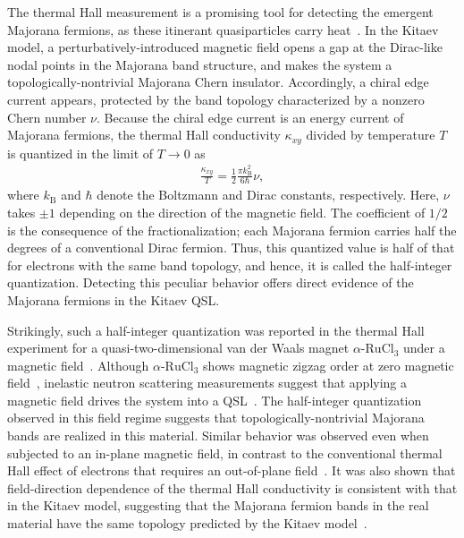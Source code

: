 \documentclass[twocolumn,superscriptaddress,showpacs, longbibliography, aps, prx]{revtex4-2}
\begin{document}
The thermal Hall measurement is a promising tool for detecting the emergent Majorana fermions, as these itinerant quasiparticles carry heat~\cite{Kitaev2006}. 
In the Kitaev model, a perturbatively-introduced magnetic field opens a gap at the Dirac-like nodal points in the Majorana band structure, and makes the system a topologically-nontrivial Majorana Chern insulator. 
Accordingly, a chiral edge current appears, protected by the band topology characterized by a nonzero Chern number $\nu$. 
Because the chiral edge current is an energy current of Majorana fermions, the thermal Hall conductivity $\kappa_{xy}$ divided by temperature $T$ is quantized in the limit of $T\to 0$ as
\begin{align}
{\frac{\kappa_{xy}}{T} = \frac{1}{2} \frac{\pi k_{\mathrm{B}}^2}{6\hbar}}\nu,
\label{eq:k_xy}
\end{align}
where $k_{\mathrm{B}}$ and $\hbar$ denote the Boltzmann and Dirac constants, respectively. 
Here, $\nu$ takes $\pm 1$ depending on the direction of the magnetic field. 
The coefficient of $1/2$ is the consequence of the fractionalization; each Majorana fermion carries half the degrees of a conventional Dirac fermion. 
Thus, this quantized value is half of that for electrons with the same band topology, and hence, it is called the half-integer quantization. 
Detecting this peculiar behavior offers direct evidence of the Majorana fermions in the Kitaev QSL.

Strikingly, such a half-integer quantization was reported in the thermal Hall experiment for a quasi-two-dimensional van der Waals magnet $\alpha$-$\mathrm{RuCl_3}$ under a magnetic field~\cite{Kasahara_Nature2018}. 
Although $\alpha$-$\mathrm{RuCl_3}$ shows magnetic zigzag order at zero magnetic field~{\cite{Sears_PRB2015,Williams_PRB2015,Cao_PRB2016}}, inelastic neutron scattering measurements suggest that applying a magnetic field drives the system into a QSL~\cite{Banerjee_npjQ2018}. 
The half-integer quantization observed in this field regime suggests that topologically-nontrivial Majorana bands are realized in this material. 
Similar behavior was observed even when subjected to an in-plane magnetic field, in contrast to the conventional thermal Hall effect of electrons that requires an out-of-plane field~\cite{Yamashita_PRB2020,Bruin_NPhys2022}. 
It was also shown that field-direction dependence of the thermal Hall conductivity is consistent with that in the Kitaev model, suggesting that the Majorana fermion bands in the real material have the same topology predicted by the Kitaev model~\cite{Yokoi_Science2021}.
\end{document}

